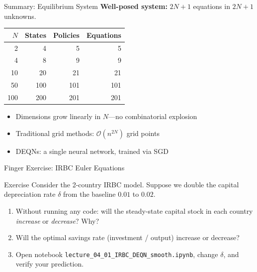 \documentclass[aspectratio=169,11pt]{beamer}
\newcommand{\emphc}[1]{\textcolor{harvardcrimson}{#1}}
\begin{document}
\begin{frame}{Summary: Equilibrium System}
\textbf{Well-posed system:} $2N+1$ equations in $2N+1$ unknowns.

\vspace{0.5em}
\begin{center}
\begin{tabular}{rrrr}
\toprule
$N$ & \textbf{States} & \textbf{Policies} & \textbf{Equations} \\
\midrule
2 & 4 & 5 & 5 \\
4 & 8 & 9 & 9 \\
10 & 20 & 21 & 21 \\
50 & 100 & 101 & 101 \\
100 & 200 & 201 & 201 \\
\bottomrule
\end{tabular}
\end{center}

\vspace{0.3em}
\begin{itemize}
    \item Dimensions grow \emphc{linearly} in $N$---no combinatorial explosion
    \item Traditional grid methods: $\mathcal{O}(n^{2N})$ grid points
    \item DEQNs: a single neural network, trained via SGD
\end{itemize}
\end{frame}

\begin{frame}{\exercisepause{} Finger Exercise: IRBC Euler Equations}
\begin{exampleblock}{Exercise}
Consider the 2-country IRBC model. Suppose we \emphc{double} the capital depreciation rate $\delta$ from the baseline $0.01$ to $0.02$.
\begin{enumerate}
    \item Without running any code: will the steady-state capital stock in each country \emph{increase} or \emph{decrease}? Why?
    \item Will the optimal savings rate (investment / output) increase or decrease?
    \item Open notebook \texttt{lecture\_04\_01\_IRBC\_DEQN\_smooth.ipynb}, change $\delta$, and verify your prediction.
\end{enumerate}
\end{exampleblock}
\end{frame}
\end{document}
